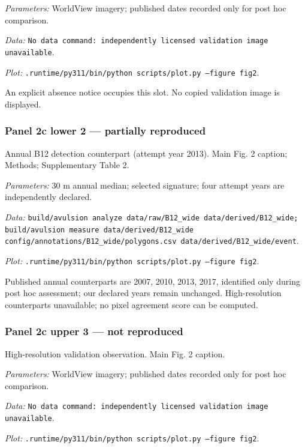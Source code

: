 \textit{Parameters:} WorldView imagery; published dates recorded only for post hoc comparison.

\textit{Data:} \texttt{No data command: independently licensed validation image unavailable}.

\textit{Plot:} \texttt{.runtime/\allowbreak{}py311/\allowbreak{}bin/\allowbreak{}python scripts/\allowbreak{}plot.py --figure fig2}.

An explicit absence notice occupies this slot. No copied validation image is displayed.

\subsubsection*{Panel 2c lower 2 --- partially reproduced}
Annual B12 detection counterpart (attempt year 2013). Main Fig. 2 caption; Methods; Supplementary Table 2.

\textit{Parameters:} 30 m annual median; selected signature; four attempt years are independently declared.

\textit{Data:} \texttt{build/\allowbreak{}avulsion analyze data/\allowbreak{}raw/\allowbreak{}B12\_wide data/\allowbreak{}derived/\allowbreak{}B12\_wide; build/\allowbreak{}avulsion measure data/\allowbreak{}derived/\allowbreak{}B12\_wide config/\allowbreak{}annotations/\allowbreak{}B12\_wide/\allowbreak{}polygons.csv data/\allowbreak{}derived/\allowbreak{}B12\_wide/\allowbreak{}event}.

\textit{Plot:} \texttt{.runtime/\allowbreak{}py311/\allowbreak{}bin/\allowbreak{}python scripts/\allowbreak{}plot.py --figure fig2}.

Published annual counterparts are 2007, 2010, 2013, 2017, identified only during post hoc assessment; our declared years remain unchanged. High-resolution counterparts unavailable; no pixel agreement score can be computed.

\subsubsection*{Panel 2c upper 3 --- not reproduced}
High-resolution validation observation. Main Fig. 2 caption.

\textit{Parameters:} WorldView imagery; published dates recorded only for post hoc comparison.

\textit{Data:} \texttt{No data command: independently licensed validation image unavailable}.

\textit{Plot:} \texttt{.runtime/\allowbreak{}py311/\allowbreak{}bin/\allowbreak{}python scripts/\allowbreak{}plot.py --figure fig2}.

